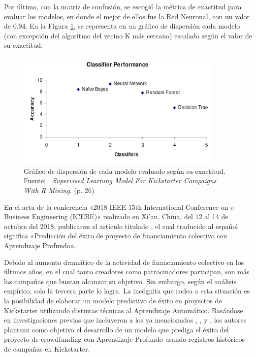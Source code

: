 Por último, con la matriz de confusión, se escogió la métrica de exactitud para evaluar los modelos, en donde el mejor de ellos fue la Red Neuronal, con un valor de 0.94. En la Figura \ref{2:fig121}, se representa en un gráfico de dispersión cada modelo (con excepción del algoritmo del vecino K más cercano) escalado según el valor de su exactitud.

\begin{figure}[!ht]
	\begin{center}
		\includegraphics[width=0.90\textwidth]{2/figures/kamath2018.jpg}
		\caption[Gráfico de dispersión de cada modelo evaluado según su exactitud]{Gráfico de dispersión de cada modelo evaluado según su exactitud.\\
			Fuente: \cite{pr_kamath2018suplearn}. \textit{Supervised Learning Model For Kickstarter Campaigns
				With R Mining}. (p. 26)}
		\label{2:fig121}
	\end{center}
\end{figure}

En el acta de la conferencia «2018 IEEE 15th International Conference on e-Business Engineering (ICEBE)» realizado en Xi'an, China, del 12 al 14 de octubre del 2018, \cite{pr_yu2018deeplearning} publicaron el artículo titulado , el cual traducido al español significa «Predicción del éxito de proyecto de financiamiento colectivo con Aprendizaje Profundo».

Debido al aumento dramático de la actividad de financiamiento colectivo en los últimos años, en el cual tanto creadores como patrocinadores participan, son más las campañas que buscan alcanzar su objetivo. Sin embargo, según el análisis empírico, solo la tercera parte lo logra. La incógnita que rodea a esta situación es la posibilidad de elaborar un modelo predictivo de éxito en proyectos de Kickstarter utilizando distintas técnicas al Aprendizaje Automático. Basándose en investigaciones previas que incluyeron a los ya mencionados \cite{pr_chen2013kickpredict}, \cite{pr_li2016predcrowd}, \cite{pr_sawhney2016usingLT} y \cite{pr_kamath2018suplearn}, los autores plantean como objetivo el desarrollo de un modelo que prediga el éxito del proyecto de crowdfunding con Aprendizaje Profundo usando registros históricos de campañas en Kickstarter.

